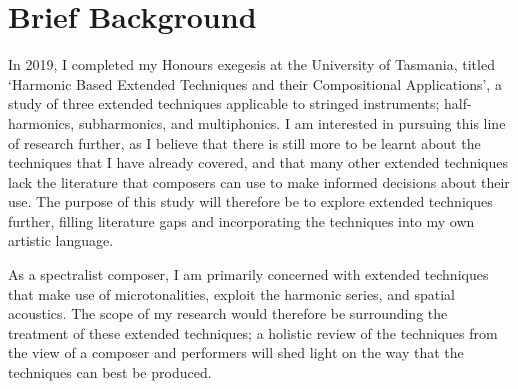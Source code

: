 \section{Brief Background}
In 2019, I completed my Honours exegesis at the University of Tasmania, titled `Harmonic Based Extended Techniques and their Compositional Applications', a study of three extended techniques applicable to stringed instruments; half-harmonics, subharmonics, and multiphonics.
I am interested in pursuing this line of research further, as I believe that there is still more to be learnt about the techniques that I have already covered, and that many other extended techniques lack the literature that composers can use to make informed decisions about their use. 
The purpose of this study will therefore be to explore extended techniques further, filling literature gaps and incorporating the techniques into my own artistic language.



As a spectralist composer, I am primarily concerned with extended techniques that make use of microtonalities, exploit the harmonic series, and spatial acoustics.
The scope of my research would therefore be surrounding the treatment of these extended techniques; a holistic review of the techniques from the view of a composer and performers will shed light on the way that the techniques can best be produced.

